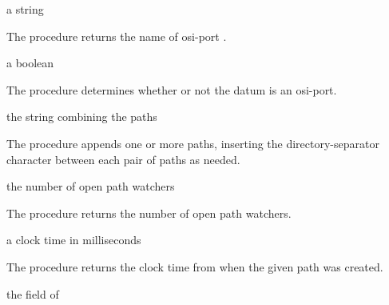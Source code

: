 \begin{procedure}
\end{procedure}
\returns{} a string

The  procedure returns the name of osi-port
.

\begin{procedure}
\end{procedure}
\returns{} a boolean

The  procedure determines whether or not the datum
 is an osi-port.

\begin{procedure}
\end{procedure}
\returns{} the string combining the paths

The  procedure appends one or more paths, inserting
the directory-separator character between each pair of paths as
needed.

\begin{procedure}
\end{procedure}
\returns{} the number of open path watchers

The  procedure returns the number of open
path watchers.

\begin{procedure}
\end{procedure}
\returns{} a clock time in milliseconds

The  procedure returns the clock time
from  when the given path  was created.

\begin{procedure}
\end{procedure}
\returns{} the  field of 

